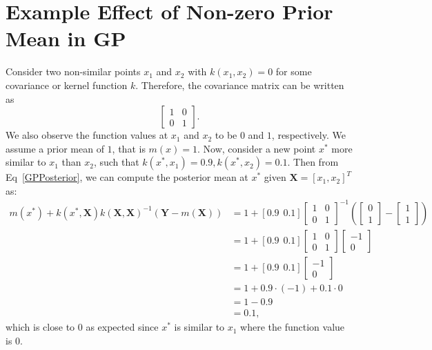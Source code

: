 \chapter{Example Effect of Non-zero Prior Mean in GP}\label{ch:nonzerogp}
Consider two non-similar points $x_1$ and $x_2$ with $k(x_1, x_2) = 0$ for some covariance or kernel function $k$. Therefore, the covariance matrix can be written as \[\left[\begin{array}{cc}
   1 & 0 \\
   0 & 1
\end{array}\right].\]We also observe the function values at $x_1$ and $x_2$ to be $0$ and $1$, respectively. We assume a prior mean of $1$, that is $m(x)=1$. Now, consider a new point $x^*$ more similar to $x_1$ than $x_2$, such that $k(x^*, x_1)=0.9, k(x^*, x_2)=0.1$. Then from Eq~\ref{GPPosterior}, we can compute the posterior mean at $x^*$ given $\mathbf{X}=[x_1, x_2]^T$ as:
{\small\begingroup
\renewcommand{\arraystretch}{1.25}
\setlength\arraycolsep{2.5pt}
\begin{align}
    m\left(x^*\right)+k\left(x^*, \mathbf{X}\right) k\left(\mathbf{X}, \mathbf{X}\right)^{-1}\left(\mathbf{Y}-m\left(\mathbf{X}\right)\right) & = 1 + [0.9 \hspace{5pt} 0.1] \left[\begin{array}{cc}
        1 & 0 \\
        0 & 1
    \end{array}\right]^{-1} \left(\left[\begin{array}{c}
        0\\
        1
        \end{array}\right] -
        \left[\begin{array}{c}
        1\\
        1
        \end{array}\right]
        \right)\\
        &= 1 + [0.9 \hspace{5pt} 0.1] \left[\begin{array}{cc}
        1 & 0 \\
        0 & 1
    \end{array}\right] \left[\begin{array}{c}
        -1\\
        0
        \end{array}\right]\\
        &= 1 + [0.9 \hspace{5pt} 0.1] \left[\begin{array}{c}
        -1\\
        0
        \end{array}\right]\\
        &= 1 + 0.9\cdot (-1) + 0.1 \cdot 0\\
        &= 1 -0.9\\
        &= 0.1,
\end{align}
\endgroup
}
which is close to $0$ as expected since $x^*$ is similar to $x_1$ where the function value is $0$.

